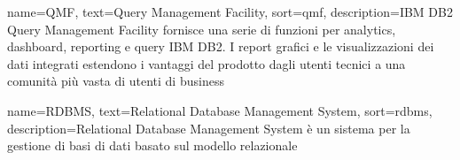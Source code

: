 {
    name=QMF,
    text=Query Management Facility,
    sort=qmf,
    description={IBM DB2 Query Management Facility fornisce una serie di funzioni per analytics, dashboard, reporting e query IBM DB2. I report grafici e le visualizzazioni dei dati integrati estendono i vantaggi del prodotto dagli utenti tecnici a una comunità più vasta di utenti di business}
}


{
    name=RDBMS,
    text=Relational Database Management System,
    sort=rdbms,
    description={Relational Database Management System è un sistema per la gestione di basi di dati basato sul modello relazionale}
}



